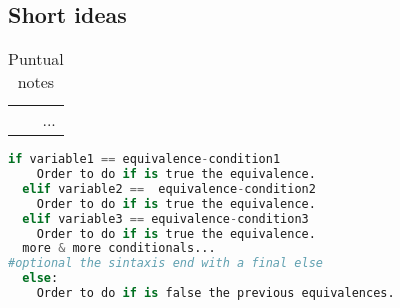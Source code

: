 \documentclass[12pt,letterpaper]{article}
\begin{document}
\subsection{Short ideas}
\begin{table}[h!]
  \centering
  \begin{tabular}{r}
    ... 
  \end{tabular}
  \caption{Puntual notes}
\end{table}
\begin{lstlisting}[language=Python, caption=\text{If, else, 'elif is equal else if' sintaxis of basics conditionals.} ]
  if variable1 == equivalence-condition1
    Order to do if is true the equivalence.
  elif variable2 ==  equivalence-condition2
    Order to do if is true the equivalence.
  elif variable3 == equivalence-condition3
    Order to do if is true the equivalence.
  more & more conditionals...  
#optional the sintaxis end with a final else
  else:
    Order to do if is false the previous equivalences.
\end{lstlisting}
\end{document}

